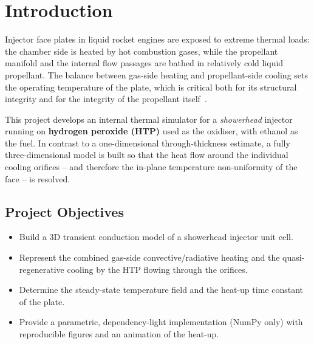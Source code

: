 \documentclass[11pt,a4paper]{article}
\begin{document}
\clearpage

\tableofcontents
\clearpage
{}

\section{Introduction}
Injector face plates in liquid rocket engines are exposed to extreme thermal
loads: the chamber side is heated by hot combustion gases, while the propellant
manifold and the internal flow passages are bathed in relatively cold liquid
propellant. The balance between gas-side heating and propellant-side cooling
sets the operating temperature of the plate, which is critical both for its
structural integrity and for the integrity of the propellant itself~\cite{huzel}.

This project develops an internal thermal simulator for a \emph{showerhead}
injector running on \textbf{hydrogen peroxide (HTP)} used as the oxidiser, with
ethanol as the fuel. In contrast to a one-dimensional through-thickness estimate,
a fully three-dimensional model is built so that the heat flow around the
individual cooling orifices -- and therefore the in-plane temperature
non-uniformity of the face -- is resolved.

\subsection{Project Objectives}
\begin{itemize}[noitemsep]
  \item Build a 3D transient conduction model of a showerhead injector unit cell.
  \item Represent the combined gas-side convective/radiative heating and the
        quasi-regenerative cooling by the HTP flowing through the orifices.
  \item Determine the steady-state temperature field and the heat-up time
        constant of the plate.
  \item Provide a parametric, dependency-light implementation (NumPy only) with
        reproducible figures and an animation of the heat-up.
\end{itemize}
\end{document}
